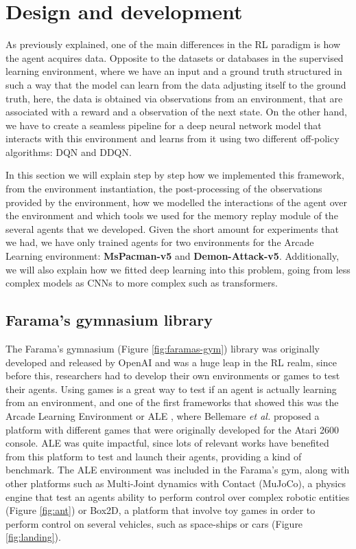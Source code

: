 \chapter{Design and development}
\label{cha:design-development}
As previously explained, one of the main differences in the RL paradigm is how the agent acquires data. Opposite to the datasets or databases in the supervised learning environment, where we have an input and a ground truth structured in such a way that the model can learn from the data adjusting itself to the ground truth, here, the data is obtained via observations from an environment, that are associated with a reward and a observation of the next state. On the other hand, we have to create a seamless pipeline for a deep neural network model that interacts with this environment and learns from it using two different off-policy algorithms: DQN and DDQN.

In this section we will explain step by step how we implemented this framework, from the environment instantiation, the post-processing of the observations provided by the environment, how we modelled the interactions of the agent over the environment and which tools we used for the memory replay module of the several agents that we developed. Given the short amount for experiments that we had, we have only trained agents for two environments for the Arcade Learning environment: \textbf{MsPacman-v5} and \textbf{Demon-Attack-v5}. Additionally, we will also explain how we fitted deep learning into this problem, going from less complex models as CNNs to more complex such as transformers. 

\section{Farama's gymnasium library}
The Farama's gymnasium (Figure \ref{fig:faramas-gym}) library was originally developed and released by OpenAI and was a huge leap in the RL realm, since before this, researchers had to develop their own environments or games to test their agents. Using games is a great way to test if an agent is actually learning from an environment, and one of the first frameworks that showed this was the Arcade Learning Environment or ALE \cite{Bellemare_2013}, where Bellemare \textit{et al.} proposed a platform with different games that were originally developed for the Atari 2600 console. ALE was quite impactful, since lots of relevant works have benefited from this platform to test and launch their agents, providing a kind of benchmark. The ALE environment was included in the Farama's gym, along with other platforms such as Multi-Joint dynamics with Contact (MuJoCo), a physics engine that test an agents ability to perform control over complex robotic entities (Figure \ref{fig:ant}) or Box2D, a platform that involve toy games in order to perform control on several vehicles, such as space-ships or cars (Figure \ref{fig:landing}).

